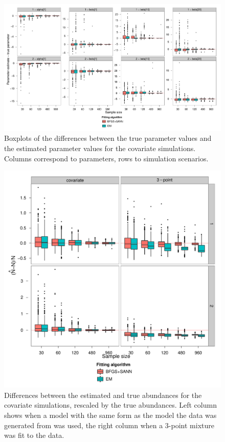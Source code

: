 \begin{figure}
\centering
\includegraphics[width=6.84in]{mix/figs/cov-boxplots.pdf}
\caption{Boxplots of the differences between the true parameter values and the estimated parameter values for the covariate simulations. Columns correspond to parameters, rows to simulation scenarios.}
\label{mmds-cov-boxplots}
\end{figure}

\begin{figure}
\centering
\includegraphics[width=6in]{mix/figs/cov-N.pdf}
\caption{Differences between the estimated and true abundances for the covariate simulations, rescaled by the true abundances. Left column shows when a model with the same form as the model the data was generated from was used, the right column when a 3-point mixture was fit to the data.}
\label{mmds-cov-N-boxplots}
\end{figure}

